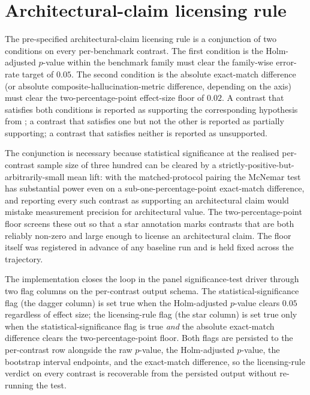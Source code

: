 \section{Architectural-claim licensing rule}
\label{app:sig-licensing}

The pre-specified architectural-claim licensing rule is a conjunction of two conditions on every per-benchmark contrast. The first condition is the Holm-adjusted $p$-value within the benchmark family must clear the family-wise error-rate target of $0.05$. The second condition is the absolute exact-match difference (or absolute composite-hallucination-metric difference, depending on the axis) must clear the two-percentage-point effect-size floor of $0.02$. A contrast that satisfies both conditions is reported as supporting the corresponding hypothesis from ; a contrast that satisfies one but not the other is reported as partially supporting; a contrast that satisfies neither is reported as unsupported.

The conjunction is necessary because statistical significance at the realised per-contrast sample size of three hundred can be cleared by a strictly-positive-but-arbitrarily-small mean lift: with the matched-protocol pairing the McNemar test has substantial power even on a sub-one-percentage-point exact-match difference, and reporting every such contrast as supporting an architectural claim would mistake measurement precision for architectural value. The two-percentage-point floor screens these out so that a star annotation marks contrasts that are both reliably non-zero and large enough to license an architectural claim. The floor itself was registered in advance of any baseline run and is held fixed across the trajectory.

The implementation closes the loop in the panel significance-test driver through two flag columns on the per-contrast output schema. The statistical-significance flag (the dagger column) is set true when the Holm-adjusted $p$-value clears $0.05$ regardless of effect size; the licensing-rule flag (the star column) is set true only when the statistical-significance flag is true \emph{and} the absolute exact-match difference clears the two-percentage-point floor. Both flags are persisted to the per-contrast row alongside the raw $p$-value, the Holm-adjusted $p$-value, the bootstrap interval endpoints, and the exact-match difference, so the licensing-rule verdict on every contrast is recoverable from the persisted output without re-running the test.

